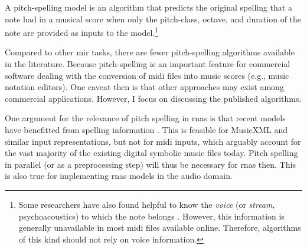 

A pitch-spelling model is an algorithm that predicts the
original spelling that a note had in a musical score when
only the pitch-class, octave, and duration of the note are
provided as inputs to the model.\footnote{Some researchers
have also found helpful to know the \emph{voice} (or
\emph{stream}, psychoacoustics) to which the note belongs
\parencite{teodoru2007pitch}. However, this information is
generally unavailable in most \gls{midi} files available
online. Therefore, algorithms of this kind should not rely
on voice information.}


Compared to other \gls{mir} tasks, there are fewer
pitch-spelling algorithms available in the literature.
Because pitch-spelling is an important feature for
commercial software dealing with the conversion of
\gls{midi} files into music scores (e.g., music notation
editors). One caveat then is that other approaches may exist
among commercial applications. However, I focus on
discussing the published algorithms.

One argument for the relevance of pitch spelling in
\glspl{rna} is that recent models have benefitted from
spelling information \parencite{micchi2020not}. This is
feasible for MusicXML and similar input representations, but
not for \gls{midi} inputs, which arguably account for the
vast majority of the existing digital symbolic music files
today. Pitch spelling in parallel (or as a preprocessing
step) will thus be necessary for \glspl{rna} then.
This is also true for implementing \glspl{rna}
models in the audio domain.
